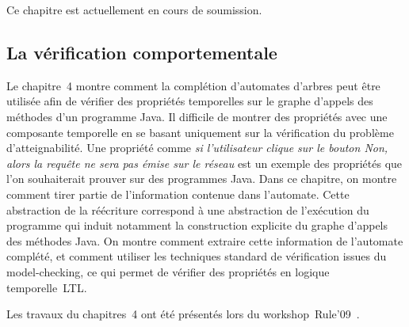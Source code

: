 Ce chapitre est actuellement en cours de soumission.%

\bigskip
\subsection*{La vérification comportementale}
Le chapitre~4 montre comment la complétion d'automates d'arbres peut être utilisée afin de vérifier 
des propriétés temporelles sur le graphe d'appels des méthodes d'un programme Java. Il difficile 
de montrer des propriétés avec une composante temporelle en se basant uniquement sur la vérification du
problème d'atteignabilité. Une propriété comme 
{\em si l'utilisateur clique sur le bouton Non, alors la requête ne sera pas émise sur le réseau} est un exemple
des propriétés que l'on souhaiterait prouver sur des programmes Java. Dans ce chapitre, on montre comment tirer partie
de l'information contenue dans l'automate. %
Cette abstraction de la réécriture correspond à une abstraction 
de l'exécution du programme qui induit notamment la construction explicite du graphe d'appels des méthodes Java.
On montre comment extraire cette information de l'automate complété, et comment utiliser les techniques standard
de vérification issues du model-checking, ce qui permet de vérifier des propriétés en logique temporelle~LTL.

Les travaux du chapitres~4 ont été présentés lors du workshop~Rule'09~\cite{BoyerG-RULE09}.

\bigskip
